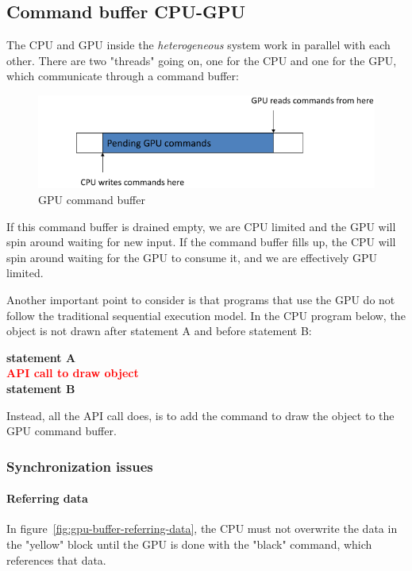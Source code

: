 \subsection{Command buffer CPU-GPU}\label{subsec:command-buffer-cpu-gpu}
The CPU and GPU inside the \textit{heterogeneous} system work in parallel with each other.
There are two "threads" going on, one for the CPU and one for the GPU, which communicate through a command buffer:

\begin{figure}[h]
    \centering
    \includegraphics[width=\linewidth]{images/gpu-command-buffer}
    \caption{GPU command buffer}
    \label{fig:gpu-command-buffer}
\end{figure}

If this command buffer is drained empty, we are CPU limited and the GPU will spin around waiting for new input.
If the command buffer fills up, the CPU will spin around waiting for the GPU to consume it, and we are effectively
GPU limited.

Another important point to consider is that programs that use the GPU do not follow the traditional sequential
execution model.
In the CPU program below, the object is not drawn after statement A and before statement B:
\begin{center}
    \textbf{statement A}\\
    \textcolor{red}{\textbf{API call to draw object}}\\
    \textbf{statement B}
\end{center}

Instead, all the API call does, is to add the command to draw the object to the GPU command buffer.

\subsubsection{Synchronization issues}
\paragraph{Referring data}
In figure~\ref{fig:gpu-buffer-referring-data}, the CPU must not overwrite the data in the "yellow" block until the GPU
is done with the "black" command, which references that data.

